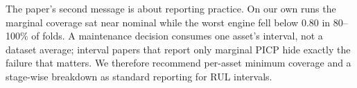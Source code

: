 The paper's second message is about reporting practice. On our own runs the marginal coverage sat near nominal while the worst engine fell below 0.80 in 80--100\% of folds. A maintenance decision consumes one asset's interval, not a dataset average; interval papers that report only marginal PICP hide exactly the failure that matters. We therefore recommend per-asset minimum coverage and a stage-wise breakdown as standard reporting for RUL intervals.

